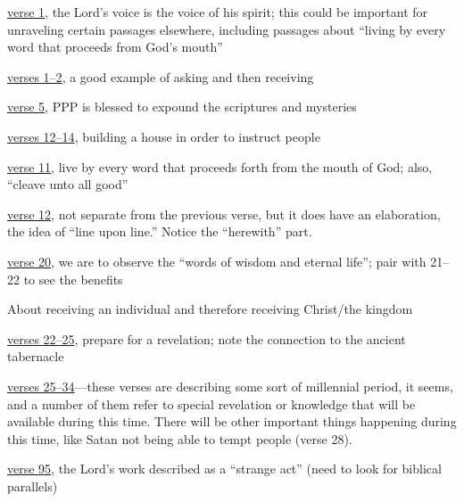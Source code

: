 \begin{compactdesc}
			\item[{\hyperref[DC97]{DC 97}}]
				\begin{compactitem}
					\item \hyperref[DC97-1]{verse 1}, the Lord's voice is the voice of his spirit; this could be important for unraveling certain passages elsewhere, including passages about ``living by every word that proceeds from God's mouth''
					\item \hyperref[DC97-1]{verses 1--2}, a good example of asking and then receiving
					\item \hyperref[DC97-5]{verse 5}, PPP is blessed to expound the scriptures and mysteries
					\item \hyperref[DC97-12]{verses 12--14}, building a house in order to instruct people
				\end{compactitem}
			\item[{\hyperref[DC98]{DC 98}}]
				\begin{compactitem}
					\item \hyperref[DC98-11]{verse 11}, live by every word that proceeds forth from the mouth of God; also, ``cleave unto all good''
					\item \hyperref[DC98-12]{verse 12}, not separate from the previous verse, but it does have an elaboration, the idea of ``line upon line.'' Notice the ``herewith'' part.
					\item \hyperref[DC98-20]{verse 20}, we are to observe the ``words of wisdom and eternal life''; pair with 21--22 to see the benefits
				\end{compactitem}
			\item[{\hyperref[DC99-2]{DC 99:2--4}}] About receiving an individual and therefore receiving Christ/the kingdom
			\item[{\hyperref[DC101]{DC 101}}]
				\begin{compactitem}
					\item \hyperref[DC101-22]{verses 22--25}, prepare for a revelation; note the connection to the ancient tabernacle
					\item \hyperref[DC101-25]{verses 25--34}---these verses are describing some sort of millennial period, it seems, and a number of them refer to special revelation or knowledge that will be available during this time. There will be other important things happening during this time, like Satan not being able to tempt people (verse 28).
					\item \hyperref[DC101-95]{verse 95}, the Lord's work described as a ``strange act'' (need to look for biblical parallels)

\end{compactitem}
\end{compactdesc}
